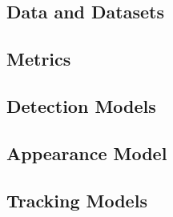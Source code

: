 \needspace{0.25\textheight}
\subsection{Data and Datasets}


\FloatBarrier

\FloatBarrier

\needspace{0.25\textheight}
\subsection{Metrics}



\needspace{0.25\textheight}
\subsection{Detection Models}



\needspace{0.25\textheight}
\subsection{Appearance Model}



\needspace{0.25\textheight}
\subsection{Tracking Models} 


